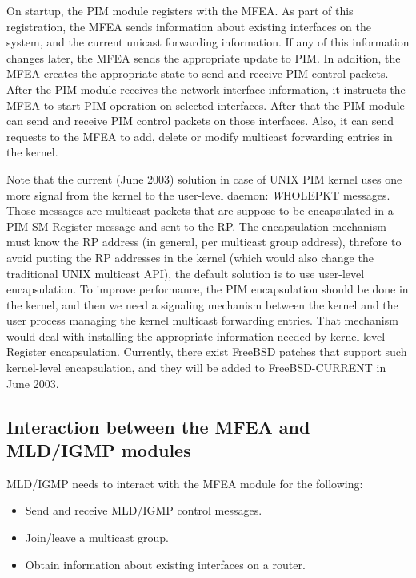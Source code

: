 \documentclass[11pt]{article}
\begin{document}
On startup, the PIM module registers with the MFEA. As part of this
registration, the MFEA sends information about existing
interfaces on the system, and the current unicast forwarding
information. If any of this information changes later, the MFEA sends
the appropriate update to PIM. In addition, the MFEA creates the
appropriate state to send and receive PIM control packets. After the
PIM module receives the network interface information, it instructs the
MFEA to start PIM operation on selected interfaces. After that the PIM
module can send and receive PIM control packets on those interfaces.
Also, it can send requests to the MFEA to add, delete or modify multicast
forwarding entries in the kernel.

Note that the current (June 2003) solution in case of UNIX PIM kernel
uses one more signal from the kernel to the user-level daemon:
{\emph WHOLEPKT} messages. Those messages are multicast packets that are
suppose to be encapsulated in a PIM-SM Register message and sent to the
RP. The encapsulation mechanism must know the RP address (in general,
per multicast group address), threfore to avoid putting the RP addresses in
the kernel (which would also change the traditional UNIX multicast API), the
default solution is to use user-level encapsulation.  To improve
performance, the PIM encapsulation should be done in the kernel, and
then we need a signaling mechanism between the kernel and the user
process managing the kernel multicast forwarding entries. That mechanism
would deal with installing the appropriate information needed by kernel-level
Register encapsulation. Currently, there exist FreeBSD patches that
support such kernel-level encapsulation, and they will be added to
FreeBSD-CURRENT in June 2003.

\subsection{Interaction between the MFEA and MLD/IGMP modules}

MLD/IGMP needs to interact with the MFEA module for the following:

\begin{itemize}

  \item Send and receive MLD/IGMP control messages.

  \item Join/leave a multicast group.

  \item Obtain information about existing interfaces on a router.

\end{itemize}
\end{document}
